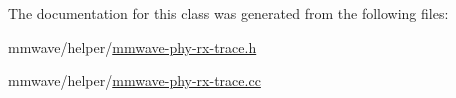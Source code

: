 The documentation for this class was generated from the following files\+:\begin{DoxyCompactItemize}
\item 
mmwave/helper/\hyperlink{mmwave-phy-rx-trace_8h}{mmwave-\/phy-\/rx-\/trace.\+h}\item 
mmwave/helper/\hyperlink{mmwave-phy-rx-trace_8cc}{mmwave-\/phy-\/rx-\/trace.\+cc}\end{DoxyCompactItemize}

